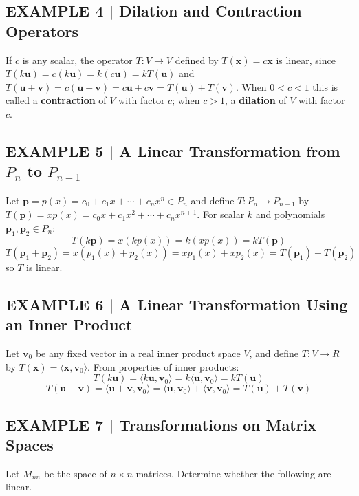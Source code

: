 \documentclass{article}
\begin{document}
\subsection*{EXAMPLE 4 | Dilation and Contraction Operators}

If $c$ is any scalar, the operator $T : V \to V$ defined by $T(\mathbf{x}) = c\mathbf{x}$ is
linear, since $T(k\mathbf{u}) = c(k\mathbf{u}) = k(c\mathbf{u}) = kT(\mathbf{u})$ and
$T(\mathbf{u}+\mathbf{v}) = c(\mathbf{u}+\mathbf{v}) = c\mathbf{u}+c\mathbf{v} = T(\mathbf{u})+T(\mathbf{v})$.
When $0 < c < 1$ this is called a \textbf{contraction} of $V$ with factor $c$; when $c > 1$,
a \textbf{dilation} of $V$ with factor $c$.

\subsection*{EXAMPLE 5 | A Linear Transformation from $P_n$ to $P_{n+1}$}

Let $\mathbf{p} = p(x) = c_0 + c_1 x + \cdots + c_n x^n \in P_n$ and define
$T : P_n \to P_{n+1}$ by $T(\mathbf{p}) = xp(x) = c_0 x + c_1 x^2 + \cdots + c_n x^{n+1}$.
For scalar $k$ and polynomials $\mathbf{p}_1, \mathbf{p}_2 \in P_n$:
\[
  T(k\mathbf{p}) = x(kp(x)) = k(xp(x)) = kT(\mathbf{p})
\]
\[
  T(\mathbf{p}_1+\mathbf{p}_2) = x(p_1(x)+p_2(x)) = xp_1(x)+xp_2(x) = T(\mathbf{p}_1)+T(\mathbf{p}_2)
\]
so $T$ is linear.

\subsection*{EXAMPLE 6 | A Linear Transformation Using an Inner Product}

Let $\mathbf{v}_0$ be any fixed vector in a real inner product space $V$, and define
$T : V \to R$ by $T(\mathbf{x}) = \langle \mathbf{x},\mathbf{v}_0\rangle$.
From properties of inner products:
\[
  T(k\mathbf{u}) = \langle k\mathbf{u},\mathbf{v}_0\rangle = k\langle\mathbf{u},\mathbf{v}_0\rangle = kT(\mathbf{u})
\]
\[
  T(\mathbf{u}+\mathbf{v}) = \langle\mathbf{u}+\mathbf{v},\mathbf{v}_0\rangle
  = \langle\mathbf{u},\mathbf{v}_0\rangle + \langle\mathbf{v},\mathbf{v}_0\rangle = T(\mathbf{u})+T(\mathbf{v})
\]

\subsection*{EXAMPLE 7 | Transformations on Matrix Spaces}

Let $M_{nn}$ be the space of $n\times n$ matrices. Determine whether the following are linear.
\end{document}
